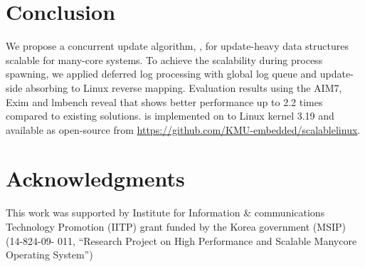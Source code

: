 \section{Conclusion}
We propose a concurrent update algorithm, , for update-heavy data
structures scalable for many-core systems.
To achieve the scalability during process spawning, 
we applied deferred log processing with global log queue and 
update-side absorbing to Linux reverse mapping.
Evaluation results using the AIM7, Exim and lmbench reveal that  shows
better performance up to 2.2 times compared to existing solutions.
 is implemented on to Linux kernel 3.19 and available as open-source
 from \url{https://github.com/KMU-embedded/scalablelinux}.

\section{Acknowledgments}
This work was supported by Institute for Information \& communications
 Technology Promotion (IITP) grant funded by the Korea government (MSIP) (14-824-09-
011, “Research Project on High Performance and Scalable Manycore Operating
 System”)







